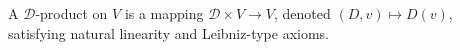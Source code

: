 A $\mathcal{D}$-product on $V$ is a mapping $\mathcal{D} \times V \to V$, denoted $(D, v) \mapsto D(v)$, satisfying natural linearity and Leibniz-type axioms.
